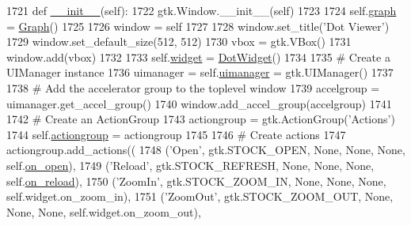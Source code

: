 \begin{DoxyCode}
1721     \textcolor{keyword}{def }\hyperlink{classsmacc__viewer_1_1xdot_1_1xdot_1_1DotWindow_a6e77276f49d67d5e40a48acb4e324a8a}{\_\_init\_\_}(self):
1722         gtk.Window.\_\_init\_\_(self)
1723 
1724         self.\hyperlink{classsmacc__viewer_1_1xdot_1_1xdot_1_1DotWindow_abc3c11e74308a0c1b3011b5c008e0df6}{graph} = \hyperlink{classsmacc__viewer_1_1xdot_1_1xdot_1_1Graph}{Graph}()
1725 
1726         window = self
1727 
1728         window.set\_title(\textcolor{stringliteral}{'Dot Viewer'})
1729         window.set\_default\_size(512, 512)
1730         vbox = gtk.VBox()
1731         window.add(vbox)
1732 
1733         self.\hyperlink{classsmacc__viewer_1_1xdot_1_1xdot_1_1DotWindow_acf94d47f2f1d324385997e26e6a46225}{widget} = \hyperlink{classsmacc__viewer_1_1xdot_1_1xdot_1_1DotWidget}{DotWidget}()
1734 
1735         \textcolor{comment}{# Create a UIManager instance}
1736         uimanager = self.\hyperlink{classsmacc__viewer_1_1xdot_1_1xdot_1_1DotWindow_a3a65f7d7acab6b8f2c9f720bfc3389dc}{uimanager} = gtk.UIManager()
1737 
1738         \textcolor{comment}{# Add the accelerator group to the toplevel window}
1739         accelgroup = uimanager.get\_accel\_group()
1740         window.add\_accel\_group(accelgroup)
1741 
1742         \textcolor{comment}{# Create an ActionGroup}
1743         actiongroup = gtk.ActionGroup(\textcolor{stringliteral}{'Actions'})
1744         self.\hyperlink{classsmacc__viewer_1_1xdot_1_1xdot_1_1DotWindow_a3e2e5fc8cc3f87f2515e6bca81e9d018}{actiongroup} = actiongroup
1745 
1746         \textcolor{comment}{# Create actions}
1747         actiongroup.add\_actions((
1748             (\textcolor{stringliteral}{'Open'}, gtk.STOCK\_OPEN, \textcolor{keywordtype}{None}, \textcolor{keywordtype}{None}, \textcolor{keywordtype}{None}, self.\hyperlink{classsmacc__viewer_1_1xdot_1_1xdot_1_1DotWindow_aa46fccb243521df058e249dfa42f544c}{on\_open}),
1749             (\textcolor{stringliteral}{'Reload'}, gtk.STOCK\_REFRESH, \textcolor{keywordtype}{None}, \textcolor{keywordtype}{None}, \textcolor{keywordtype}{None}, self.\hyperlink{classsmacc__viewer_1_1xdot_1_1xdot_1_1DotWindow_a2a05d4752e76055f81624e561450d0bb}{on\_reload}),
1750             (\textcolor{stringliteral}{'ZoomIn'}, gtk.STOCK\_ZOOM\_IN, \textcolor{keywordtype}{None}, \textcolor{keywordtype}{None}, \textcolor{keywordtype}{None}, self.widget.on\_zoom\_in),
1751             (\textcolor{stringliteral}{'ZoomOut'}, gtk.STOCK\_ZOOM\_OUT, \textcolor{keywordtype}{None}, \textcolor{keywordtype}{None}, \textcolor{keywordtype}{None}, self.widget.on\_zoom\_out),

\end{DoxyCode}

